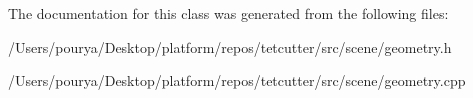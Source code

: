 The documentation for this class was generated from the following files\+:\begin{DoxyCompactItemize}
\item 
/\+Users/pourya/\+Desktop/platform/repos/tetcutter/src/scene/geometry.\+h\item 
/\+Users/pourya/\+Desktop/platform/repos/tetcutter/src/scene/geometry.\+cpp\end{DoxyCompactItemize}
